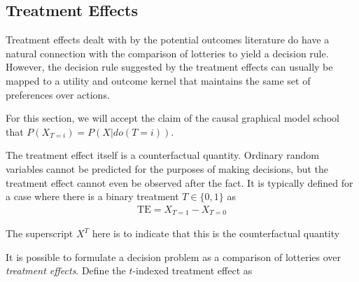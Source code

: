 




\subsection{Treatment Effects}

Treatment effects dealt with by the potential outcomes literature do have a natural connection with the comparison of lotteries to yield a decision rule. However, the decision rule suggested by the treatment effects can usually be mapped to a utility and outcome kernel that maintains the same set of preferences over actions.

For this section, we will accept the claim of the causal graphical model school that $P(X_{T=i})=P(X|do(T=i))$.

The treatment effect itself is a counterfactual quantity. Ordinary random variables cannot be predicted for the purposes of making decisions, but the treatment effect cannot even be observed after the fact. It is typically defined for a case where there is a binary treatment $T\in\{0,1\}$ as
\begin{align}
    \text{TE} = X_{T=1} - X_{T=0}
\end{align}

The superscript $X^T$ here is to indicate that this is the counterfactual quantity 

It is possible to formulate a decision problem as a comparison of lotteries over \emph{treatment effects}. Define the $t$-indexed treatment effect as

